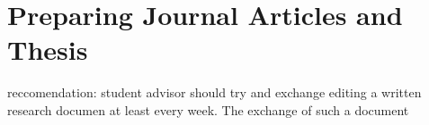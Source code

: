 %
%
%
%
%
%
%
%
%

\section{Preparing Journal Articles and Thesis}

reccomendation: student advisor should try and exchange editing a written 
research documen at least every week. The exchange of such a document 

